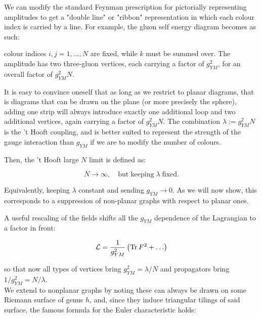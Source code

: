 We can modify the standard Feynman prescription for pictorially representing amplitudes to get a "double line" or "ribbon" representation in which each colour index is carried by a line. For example, the gluon self energy diagram becomes as such:

\begin{center}
\def\svgwidth{200pt}

\end{center}

colour indices $i, j = 1 , \ldots , N$ are fixed, while $k$ must be summed over. The amplitude has two three-gluon vertices, each carrying a factor of $g_{YM}^2$, for an overall factor of $g_{YM}^2 N$.

It is easy to convince oneself that as long as we restrict to planar diagrams, that is diagrams that can be drawn on the plane (or more precisely the sphere), adding one strip will always introduce exactly one additional loop and two additional vertices, again carrying a factor of $g_{YM}^2 N$. The combination $\lambda := g_{YM}^2 N$ is the 't Hooft coupling, and is better suited to represent the strength of the gauge interaction than $g_{YM}$ if we are to modify the number of colours.

Then, the 't Hooft large $N$ limit is defined as:

\begin{equation}
N \rightarrow \infty, \quad \mathrm{but \; keeping } \; \lambda \; \mathrm{fixed.}
\end{equation}

Equivalently, keeping $\lambda$ constant and sending $g_{YM} \rightarrow 0$. As we will now show, this corresponds to a suppression of non-planar graphs with respect to planar ones.

A useful rescaling of the fields shifts all the $g_{YM}$ dependence of the Lagrangian to a factor in front:

\begin{equation} \label{rescaling} \mathcal{L} = \frac{1}{g_{YM}^2} \left( \operatorname{Tr} F^2 + \ldots \right) \end{equation}

so that now all types of vertices bring $g_{YM}^2 = \lambda/N$ and propagators bring $1/g_{YM}^2 = N/\lambda$.\\

We extend to nonplanar graphs by noting these can always be drawn on some Riemann surface of genus $h$, and, since they induce triangular tilings of said surface, the famous formula for the Euler characteristic holds:

